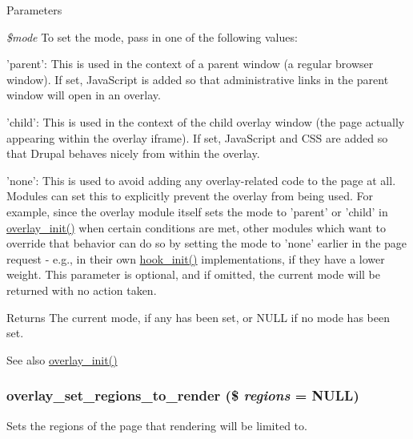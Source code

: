 \begin{DoxyParams}{Parameters}
\item[{\em \$mode}]To set the mode, pass in one of the following values:
\begin{DoxyItemize}
\item 'parent': This is used in the context of a parent window (a regular browser window). If set, JavaScript is added so that administrative links in the parent window will open in an overlay.
\item 'child': This is used in the context of the child overlay window (the page actually appearing within the overlay iframe). If set, JavaScript and CSS are added so that Drupal behaves nicely from within the overlay.
\item 'none': This is used to avoid adding any overlay-\/related code to the page at all. Modules can set this to explicitly prevent the overlay from being used. For example, since the overlay module itself sets the mode to 'parent' or 'child' in \hyperlink{overlay_8module_aa31ec5e73a1837996e5e33e8b814f1fd}{overlay\_\-init()} when certain conditions are met, other modules which want to override that behavior can do so by setting the mode to 'none' earlier in the page request -\/ e.g., in their own \hyperlink{group__hooks_ga74edef0c463436fdbb1f92ef367db051}{hook\_\-init()} implementations, if they have a lower weight. This parameter is optional, and if omitted, the current mode will be returned with no action taken.
\end{DoxyItemize}\end{DoxyParams}
\begin{DoxyReturn}{Returns}
The current mode, if any has been set, or NULL if no mode has been set.
\end{DoxyReturn}
\begin{DoxySeeAlso}{See also}
\hyperlink{overlay_8module_aa31ec5e73a1837996e5e33e8b814f1fd}{overlay\_\-init()} 
\end{DoxySeeAlso}
\hypertarget{overlay_8module_a85425da3ee5e291413da34bf6d966411}{
\subsubsection[{overlay\_\-set\_\-regions\_\-to\_\-render}]{\setlength{\rightskip}{0pt plus 5cm}overlay\_\-set\_\-regions\_\-to\_\-render (\$ {\em regions} = {\ttfamily NULL})}}
\label{overlay_8module_a85425da3ee5e291413da34bf6d966411}
Sets the regions of the page that rendering will be limited to.


